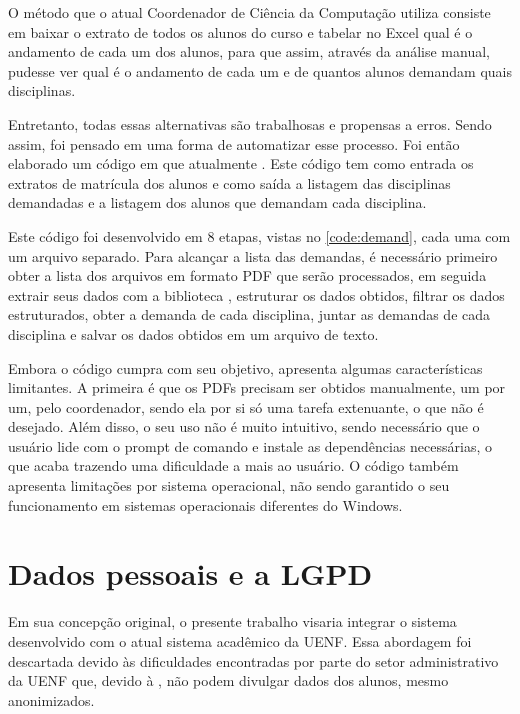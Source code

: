O método que o atual Coordenador de Ciência da Computação utiliza consiste em baixar o extrato de todos os alunos do curso e tabelar no Excel qual é o andamento de cada um dos alunos, para que assim, através da análise manual, pudesse ver qual é o andamento de cada um e de quantos alunos demandam quais disciplinas.

Entretanto, todas essas alternativas são trabalhosas e propensas a erros. Sendo assim, foi pensado em uma forma de automatizar esse processo. Foi então elaborado um código em  que atualmente . Este código tem como entrada os extratos de matrícula dos alunos e como saída a listagem das disciplinas demandadas e a listagem dos alunos que demandam cada disciplina.



Este código foi desenvolvido em 8 etapas, vistas no \autoref{code:demand}, cada uma com um arquivo separado. Para alcançar a lista das demandas, é necessário primeiro obter a lista dos arquivos em formato PDF que serão processados, em seguida extrair seus dados com a biblioteca , estruturar os dados obtidos, filtrar os dados estruturados, obter a demanda de cada disciplina, juntar as demandas de cada disciplina e salvar os dados obtidos em um arquivo de texto.

Embora o código cumpra com seu objetivo, apresenta algumas características limitantes. A primeira é que os PDFs precisam ser obtidos manualmente, um por um, pelo coordenador, sendo ela por si só uma tarefa extenuante, o que não é desejado. Além disso, o seu uso não é muito intuitivo, sendo necessário que o usuário lide com o prompt de comando e instale as dependências necessárias, o que acaba trazendo uma dificuldade a mais ao usuário. O código também apresenta limitações por sistema operacional, não sendo garantido o seu funcionamento em sistemas operacionais diferentes do Windows.

\section{Dados pessoais e a LGPD} \label{sec:LGPD} %

Em sua concepção original, o presente trabalho visaria integrar o sistema desenvolvido com o atual sistema acadêmico da UENF. Essa abordagem foi descartada devido às dificuldades encontradas por parte do setor administrativo da UENF que, devido à , não podem divulgar dados dos alunos, mesmo anonimizados.

